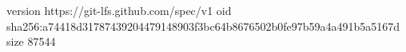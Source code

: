 version https://git-lfs.github.com/spec/v1
oid sha256:a74418d31787439204479148903f3bc64b8676502b0fe97b59a4a491b5a5167d
size 87544
